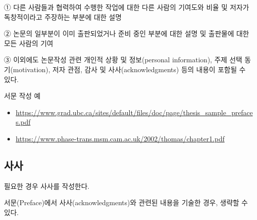 \documentclass[11pt]{report}
\numberwithin{figure}{section}
\theoremstyle{plain}
\theoremstyle{definition}
\theoremstyle{corollary}
\theoremstyle{definition}
\theoremstyle{plain}
\theoremstyle{definition}
\theoremstyle{plain}
\begin{document}
① 다른 사람들과 협력하여 수행한 작업에 대한 다른 사람의 기여도와 비율 및 저자가 독창적이라고 주장하는 부분에 대한 설명\par
② 논문의 일부분이 이미 출판되었거나 준비 중인 부분에 대한 설명 및 출판물에 대한 모든 사람의 기여\par
③ 이외에도 논문작성 관련 개인적 상황 및 정보(personal information), 주제 선택 동기(motivation), 저자 관점, 감사 및 사사(acknowledgments) 등의 내용이 포함될 수 있다.\par

\bigskip
서문 작성 예
\begin{itemize}
\item\url{https://www.grad.ubc.ca/sites/default/files/doc/page/thesis_sample_prefaces.pdf}
\item\url{https://www.phase-trans.msm.cam.ac.uk/2002/thomas/chapter1.pdf}
\end{itemize}

\newpage
\begin{center}
\section*{사사}
\end{center}

\normalsize
필요한 경우 사사를 작성한다. \par
서문(Preface)에서 사사(acknowledgments)와 관련된 내용을 기술한 경우, 생략할 수 있다.

\newpage
\renewcommand*\contentsname{목차}
\tableofcontents



\renewcommand{\listtablename}{표 목차}
\listoftables


\renewcommand{\listfigurename}{그림 목차}
\listoffigures
\end{document}
